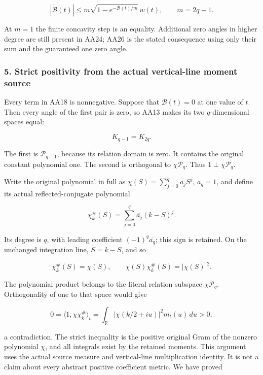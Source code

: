 \[
\boxed{
|\dot{\mathcal B}(t)|
\le m\sqrt{1-e^{-\mathcal B(t)/m}}\,w(t),
\qquad m=2q-1.
}
\tag{AA26}
\]

At \(m=1\) the finite concavity step is an equality. Additional zero angles in higher degree are still present in AA24; AA26 is the stated consequence using only their sum and the guaranteed one zero angle.

\subsubsection{5. Strict positivity from the actual vertical-line moment source}\label{endpoint-all_degree_angle_review--strict-positivity-from-the-actual-vertical-line-moment-source}

Every term in AA18 is nonnegative. Suppose that \(\mathcal B(t)=0\) at one value of \(t\). Then every angle of the first pair is zero, so AA13 makes its two \(q\)-dimensional spaces equal:

\[
K_{q-1}=K_{2q}.
\tag{AA27}
\]

The first is \(\mathcal P_{q-1}\), because its relation domain is zero. It contains the original constant polynomial one. The second is orthogonal to \(\chi\mathcal P_q\). Thus \(1\perp\chi\mathcal P_q\).

Write the original polynomial in full as \(\chi(S)=\sum_{j=0}^q a_jS^j\), \(a_q=1\), and define its actual reflected-conjugate polynomial

\[
\chi_k^{\#}(S)=\sum_{j=0}^q\overline{a_j}(k-S)^j.
\tag{AA28}
\]

Its degree is \(q\), with leading coefficient \((-1)^q\overline{a_q}\); this sign is retained. On the unchanged integration line, \(\overline S=k-S\), and so

\[
\chi_k^{\#}(S)=\overline{\chi(S)},\qquad
\chi(S)\chi_k^{\#}(S)=|\chi(S)|^2.
\tag{AA29}
\]

The polynomial product belongs to the literal relation subspace \(\chi\mathcal P_q\). Orthogonality of one to that space would give

\[
0=\langle1,\chi\chi_k^{\#}\rangle_t
=\int_{\mathbb R}|\chi(k/2+iu)|^2m_t(u)\,du>0,
\tag{AA30}
\]

a contradiction. The strict inequality is the positive original Gram of the nonzero polynomial \(\chi\), and all integrals exist by the retained moments. This argument uses the actual source measure and vertical-line multiplication identity. It is not a claim about every abstract positive coefficient metric. We have proved

